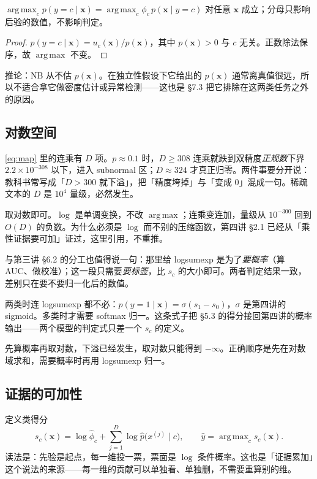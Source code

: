 \documentclass[11pt,a4paper,fontset=windows,zihao=-4]{ctexart}
\newcommand{\bx}{\mathbf{x}}
\DeclareMathOperator*{\argmax}{arg\,max}
\begin{document}
\begin{prop}[分母可以不算]
$\argmax_c p(y=c\mid\bx)=\argmax_c \phi_c\,p(\bx\mid y=c)$ 对任意 $\bx$ 成立；分母只影响后验的数值，不影响判定。
\end{prop}

\begin{proof}
$p(y=c\mid\bx)=u_c(\bx)/p(\bx)$，其中 $p(\bx)>0$ 与 $c$ 无关。正数除法保序，故 $\argmax$ 不变。
\end{proof}

推论：NB 从不估 $p(\bx)$。在独立性假设下它给出的 $p(\bx)$ 通常离真值很远，所以不适合拿它做密度估计或异常检测——这也是 §7.3 把它排除在这两类任务之外的原因。

\subsection{对数空间}

\eqref{eq:map} 里的连乘有 $D$ 项。$p\approx0.1$ 时，$D\ge308$ 连乘就跌到双精度\emph{正规数}下界 $2.2\times10^{-308}$ 以下，进入 subnormal 区；$D\approx324$ 才真正归零。两件事要分开说：教科书常写成「$D>300$ 就下溢」，把「精度垮掉」与「变成 $0$」混成一句。稀疏文本的 $D$ 是 $10^4$ 量级，必然发生。

取对数即可。$\log$ 是单调变换，不改 $\argmax$；连乘变连加，量级从 $10^{-300}$ 回到 $O(D)$ 的负数。为什么必须是 $\log$ 而不别的压缩函数，第四讲 §2.1 已经从「乘性证据要可加」证过，这里引用，不重推。

与第三讲 §6.2 的分工也值得说一句：那里给 logsumexp 是为了\emph{要概率}（算 AUC、做校准）；这一段只需要\emph{要标签}，比 $s_c$ 的大小即可。两者判定结果一致，差别只在要不要归一化后的数值。

两类时连 logsumexp 都不必：$p(y=1\mid\bx)=\sigma(s_1-s_0)$，$\sigma$ 是第四讲的 sigmoid。多类时才需要 softmax 归一。这条式子把 §5.3 的得分接回第四讲的概率输出——两个模型的判定式只差一个 $s_c$ 的定义。

\begin{warn}[顺序错了就白算]
先算概率再取对数，下溢已经发生，取对数只能得到 $-\infty$。正确顺序是先在对数域求和，需要概率时再用 logsumexp 归一。
\end{warn}

\subsection{证据的可加性}

定义类得分
\begin{equation}
  s_c(\bx)=\log\hat\phi_c+\sum_{j=1}^{D}\log\hat p\bigl(x^{(j)}\mid c\bigr),
  \qquad \hat y=\argmax_c s_c(\bx).
  \label{eq:score}
\end{equation}
读法是：先验是起点，每一维投一票，票面是 $\log$ 条件概率。这也是「证据累加」这个说法的来源——每一维的贡献可以单独看、单独删，不需要重算别的维。
\end{document}
